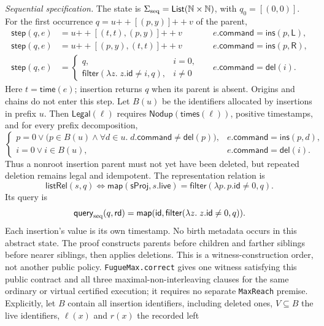 \documentclass[11pt]{article}
\theoremstyle{definition}
\newcommand{\N}{\mathbb N}
\newcommand{\lean}[1]{\texttt{#1}}
\begin{document}
\emph{Sequential specification.} The state is
$\Sigma_{\rm seq}=\mathsf{List}(\N\times\N)$, with $q_0=[(0,0)]$.
For the first occurrence $q=u{+\!+}[(p,y)]{+\!+}v$ of the parent,
\[
\begin{aligned}
 \mathsf{step}(q,e)&=u{+\!+}[(t,t),(p,y)]{+\!+}v
   && e.\mathsf{command}=\mathsf{ins}(p,\mathsf{L}),\\
 \mathsf{step}(q,e)&=u{+\!+}[(p,y),(t,t)]{+\!+}v
   && e.\mathsf{command}=\mathsf{ins}(p,\mathsf{R}),\\
 \mathsf{step}(q,e)&=\begin{cases}
 q,&i=0,\\ \mathsf{filter}(\lambda z.\;z.\mathsf{id}\ne i,q),&i\ne0
 \end{cases}
   && e.\mathsf{command}=\mathsf{del}(i).
\end{aligned}
\]
Here $t=\mathsf{time}(e)$; insertion returns $q$ when its parent is absent.
Origins and chains do not enter this step. Let $B(u)$ be the identifiers
allocated by insertions in prefix $u$. Then $\mathsf{Legal}(\ell)$ requires
$\mathsf{Nodup}(\mathsf{times}(\ell))$, positive timestamps, and for every
prefix decomposition,
\[
\begin{cases}
 p=0\lor\bigl(p\in B(u)\land
   \forall d\in u.\;d.\mathsf{command}\ne\mathsf{del}(p)\bigr),
   &e.\mathsf{command}=\mathsf{ins}(p,d),\\
 i=0\lor i\in B(u),&e.\mathsf{command}=\mathsf{del}(i).
\end{cases}
\]
Thus a nonroot insertion parent must not yet have been deleted, but repeated
deletion remains legal and idempotent. The representation relation is
\[
 \mathsf{listRel}(s,q)\Longleftrightarrow
 \mathsf{map}(\mathsf{sProj},s.\mathsf{live})
   =\mathsf{filter}(\lambda p.\,p.\mathsf{id}\ne0,q).
\]
Its query is
\[
 \mathsf{query}_{\rm seq}(q,\mathsf{rd})=
 \mathsf{map}(\mathsf{id},\mathsf{filter}(\lambda z.\;z.\mathsf{id}\ne0,q)).
\]
Each insertion's value is its own timestamp.
No birth metadata occurs in this abstract state. The proof constructs parents
before children and farther siblings before nearer siblings, then applies
deletions. This is a witness-construction order, not another public policy.
\lean{FugueMax.correct} gives one witness satisfying this public contract and
all three maximal-non-interleaving clauses for the same ordinary or virtual
certified execution; it requires no separate \lean{MaxReach} premise.
Explicitly, let $B$ contain all insertion identifiers, including deleted ones,
$V\subseteq B$ the live identifiers, $\ell(x)$ and $r(x)$ the recorded left
\end{document}
